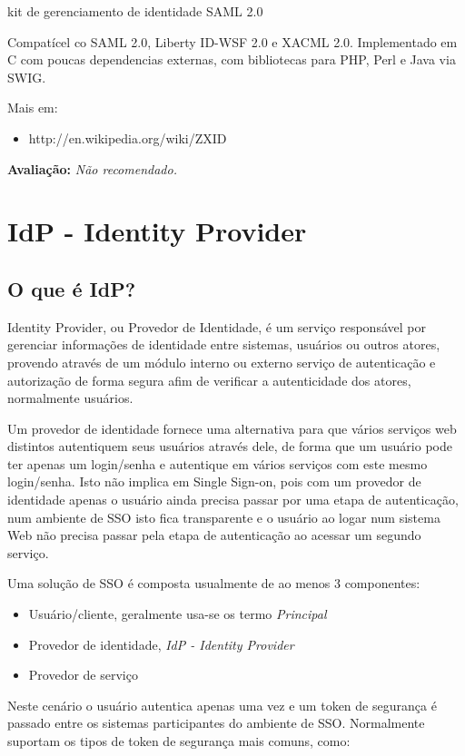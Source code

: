 \documentclass[11pt]{article}
\begin{document}
kit de gerenciamento de identidade SAML 2.0

Compatícel co SAML 2.0, Liberty ID-WSF 2.0 e XACML 2.0. Implementado em C com
poucas dependencias externas, com bibliotecas para PHP, Perl e Java via SWIG.

Mais em:
\begin{itemize}
  \item{http://en.wikipedia.org/wiki/ZXID}
\end{itemize}

{\bf Avaliação:} {\it Não recomendado.}

\section{IdP - Identity Provider}

\subsection{O que é IdP?}

Identity Provider, ou Provedor de Identidade, é um serviço responsável por
gerenciar informações de identidade entre sistemas, usuários ou outros atores,
provendo através de um módulo interno ou externo serviço de autenticação e
autorização de forma segura afim de verificar a autenticidade dos atores,
normalmente usuários.

Um provedor de identidade fornece uma alternativa para que vários serviços web
distintos autentiquem seus usuários através dele, de forma que um usuário pode
ter apenas um login/senha e autentique em vários serviços com este mesmo
login/senha. Isto não implica em Single Sign-on, pois com um provedor de
identidade apenas o usuário ainda precisa passar por uma etapa de
autenticação, num ambiente de SSO isto fica transparente e o usuário ao logar
num sistema Web não precisa passar pela etapa de autenticação ao acessar um
segundo serviço.

Uma solução de SSO é composta usualmente de ao menos 3 componentes:

\begin{itemize}
  \item{Usuário/cliente, geralmente usa-se os termo {\it Principal}}
  \item{Provedor de identidade, {\it IdP - Identity Provider}}
  \item{Provedor de serviço}
\end{itemize}

Neste cenário o usuário autentica apenas uma vez e um token de segurança
é passado entre os sistemas participantes do ambiente de SSO. Normalmente
suportam os tipos de token de segurança mais comuns, como:
\end{document}
